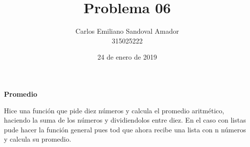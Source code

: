 \documentclass[letterpaper, 12pt, oneside]{article}%
\title{Problema 06}
\author{Carlos Emiliano Sandoval Amador \\ 315025222}
\date{24 de enero de 2019}
\begin{document}
	\maketitle
	\begin{center}
		\textbf{\large Promedio}
	\end{center}
	Hice una función que pide diez números y calcula el promedio aritmético, haciendo la suma de los números y dividiendolos entre diez. En el caso con listas pude hacer la función general pues tod que ahora recibe una lista con n números y calcula su promedio.
\end{document}
